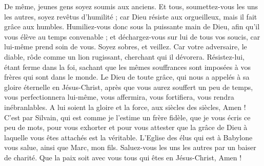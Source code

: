 \begin{multicols}{2}
De même, jeunes gens soyez soumis aux anciens. Et tous, soumettez-vous les uns les autres, soyez revêtus d'humilité ; car Dieu résiste aux orgueilleux, mais il fait grâce aux humbles.
Humiliez-vous donc sous la puissante main de Dieu, afin qu'il vous élève au temps convenable ;
et déchargez-vous sur lui de tous vos soucis, car lui-même prend soin de vous.
Soyez sobres, et veillez. Car votre adversaire, le diable, rôde comme un lion rugissant, cherchant qui il dévorera.
Résistez-lui, étant ferme dans la foi, sachant que les mêmes souffrances sont imposées à vos frères qui sont dans le monde.
Le Dieu de toute grâce, qui nous a appelés à sa gloire éternelle en Jésus-Christ, après que vous aurez souffert un peu de temps, vous perfectionnera lui-même, vous affermira, vous fortifiera, vous rendra inébranlables.
A lui soient la gloire et la force, aux siècles des siècles, Amen !
C'est par Silvain, qui est comme je l'estime un frère fidèle, que je vous écris ce peu de mots, pour vous exhorter et pour vous attester que la grâce de Dieu à laquelle vous êtes attachés est la véritable.
L'Eglise des élus qui est à Babylone vous salue, ainsi que Marc, mon fils.
Saluez-vous les uns les autres par un baiser de charité. Que la paix soit avec vous tous qui êtes en Jésus-Christ, Amen !
\PPE{}
\end{multicols}
